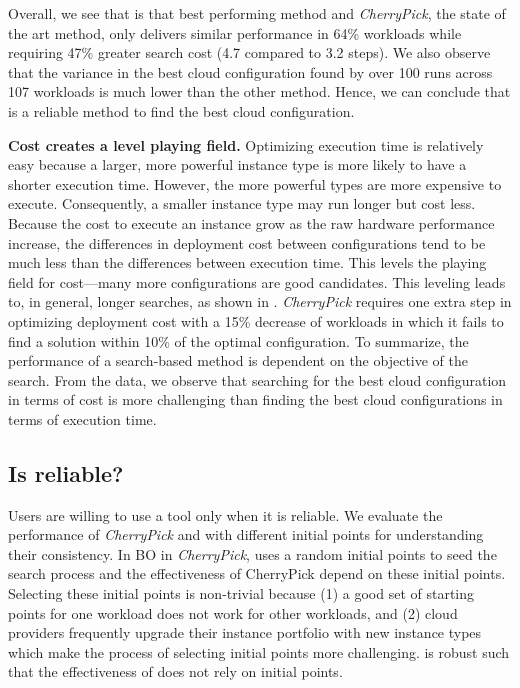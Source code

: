 Overall, we see that \scout is that best performing method and \emph{CherryPick}, the state of the art method, only delivers similar performance in 64\% workloads while requiring 47\% greater search cost (4.7 compared to 3.2 steps). We also observe that the variance in the best cloud configuration found by \scout over 100 runs across 107 workloads is much lower than the other method. Hence, we can conclude that \scout is a reliable method to find the best cloud configuration.

\noindent\textbf{Cost creates a level playing field.}
Optimizing execution time is relatively easy
because a larger, more powerful instance type is more likely to have a shorter execution time.
However, the more powerful types are more expensive to execute.
Consequently, a smaller instance type may run longer but cost less.
Because the cost to execute an instance grow as the raw hardware performance increase, the differences in deployment cost between configurations tend to be much less than the differences between execution time.
This levels the playing field for cost---many more configurations are good candidates.
This leveling leads to, in general, longer searches,
as shown in \myfigure{\ref{fig:single_cost_overall_steps}}.
\emph{CherryPick} requires one extra step in optimizing deployment cost with a 15\% decrease of workloads in which it fails to find a solution within 10\% of the optimal configuration. To summarize, the performance of a search-based method is dependent on the objective of the search. From the data, we observe that searching for the best cloud configuration in terms of cost is more challenging than finding the best cloud configurations in terms of execution time. 




\subsection{Is \scout reliable?}
Users are willing to use a tool only when it is reliable. We evaluate the performance of \emph{CherryPick} and \scout
with different initial points for understanding their consistency.
In BO in \emph{CherryPick}, uses a random initial points to seed the search process and the effectiveness of CherryPick depend on these initial points. Selecting these initial points is non-trivial because (1) a good set of starting points for one workload does not work for other workloads, and (2) cloud providers frequently upgrade their instance portfolio with new instance types which make the process of selecting initial points more challenging. \scout is robust such that the effectiveness of \scout does not rely on initial points.


